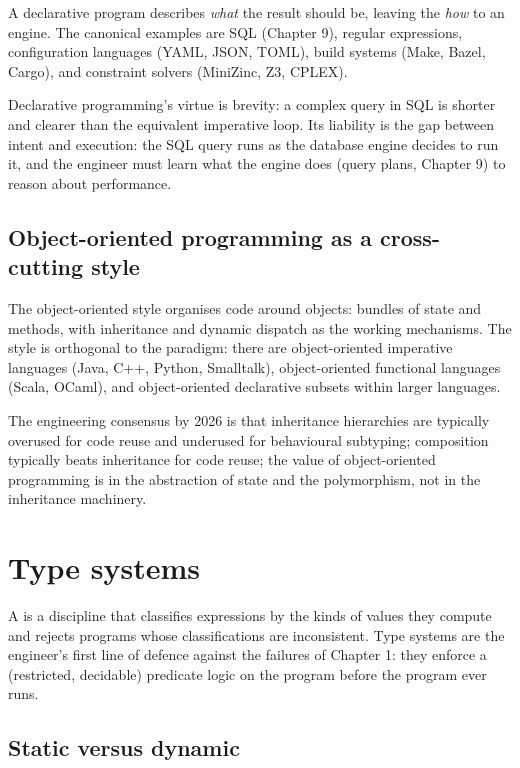 A declarative program describes \emph{what} the result should be, leaving the \emph{how} to an engine. The canonical examples are SQL (Chapter 9), regular expressions, configuration languages (YAML, JSON, TOML), build systems (Make, Bazel, Cargo), and constraint solvers (MiniZinc, Z3, CPLEX).

Declarative programming's virtue is brevity: a complex query in SQL is shorter and clearer than the equivalent imperative loop. Its liability is the gap between intent and execution: the SQL query runs as the database engine decides to run it, and the engineer must learn what the engine does (query plans, Chapter 9) to reason about performance.

\subsection{Object-oriented programming as a cross-cutting style}

The object-oriented style organises code around objects: bundles of state and methods, with inheritance and dynamic dispatch as the working mechanisms. The style is orthogonal to the paradigm: there are object-oriented imperative languages (Java, C++, Python, Smalltalk), object-oriented functional languages (Scala, OCaml), and object-oriented declarative subsets within larger languages.

The engineering consensus by 2026 is that inheritance hierarchies are typically overused for code reuse and underused for behavioural subtyping; composition typically beats inheritance for code reuse; the value of object-oriented programming is in the abstraction of state and the polymorphism, not in the inheritance machinery.

\section{Type systems}

A  is a discipline that classifies expressions by the kinds of values they compute and rejects programs whose classifications are inconsistent. Type systems are the engineer's first line of defence against the failures of Chapter 1: they enforce a (restricted, decidable) predicate logic on the program before the program ever runs.

\subsection{Static versus dynamic}

